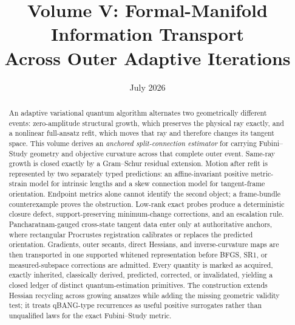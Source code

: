 \documentclass[10pt,twocolumn]{article}
\title{\vspace{-1.8em}\textbf{Volume V: Formal-Manifold Information Transport\\Across Outer Adaptive Iterations}}
\author{}
\date{July 2026}
\theoremstyle{definition}
\theoremstyle{remark}
\begin{document}
\maketitle

\begin{abstract}
An adaptive variational quantum algorithm alternates two geometrically different events: zero-amplitude structural growth, which preserves the physical ray exactly, and a nonlinear full-ansatz refit, which moves that ray and therefore changes its tangent space.  This volume derives an \emph{anchored split-connection estimator} for carrying Fubini--Study geometry and objective curvature across that complete outer event.  Same-ray growth is closed exactly by a Gram--Schur residual extension.  Motion after refit is represented by two separately typed predictions: an affine-invariant positive metric-strain model for intrinsic lengths and a skew connection model for tangent-frame orientation.  Endpoint metrics alone cannot identify the second object; a frame-bundle counterexample proves the obstruction.  Low-rank exact probes produce a deterministic closure defect, support-preserving minimum-change corrections, and an escalation rule.  Pancharatnam-gauged cross-state tangent data enter only at authoritative anchors, where rectangular Procrustes registration calibrates or replaces the predicted orientation.  Gradients, outer secants, direct Hessians, and inverse-curvature maps are then transported in one supported whitened representation before BFGS, SR1, or measured-subspace corrections are admitted.  Every quantity is marked as acquired, exactly inherited, classically derived, predicted, corrected, or invalidated, yielding a closed ledger of distinct quantum-estimation primitives.  The construction extends Hessian recycling across growing ansatzes while adding the missing geometric validity test; it treats qBANG-type recurrences as useful positive surrogates rather than unqualified laws for the exact Fubini--Study metric.
\end{abstract}

\tableofcontents
\end{document}
